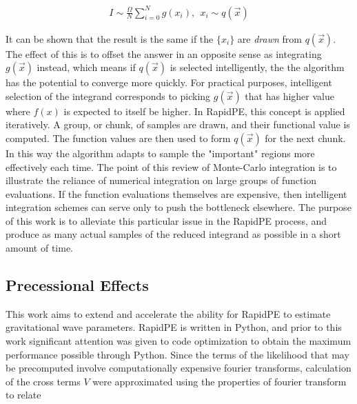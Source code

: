 \begin{align}
I \sim \frac{\Omega}{N}\sum_{i = 0}^N g(x_i), \ \ x_i \sim q(\vec{x})
\end{align}

It can be shown that the result is the same if the $\{x_i\}$ are \textit{drawn} from $q(\vec{x})$. The effect of this is to offset the answer in an opposite sense as integrating $g(\vec{x})$ instead, which means if $q(\vec{x})$ is selected intelligently, the the algorithm has the potential to converge more quickly. For practical purposes, intelligent selection of the integrand corresponds to picking $g(\vec{x})$ that has higher value where $f(x)$ is expected to itself be higher. 
In RapidPE, this concept is applied iteratively. A group, or chunk, of samples are drawn, and their functional value is computed. The function values are then used to form $q(\vec{x})$ for the next chunk. In this way the algorithm adapts to sample the "important" regions more effectively each time. 
The point of this review of Monte-Carlo integration is to illustrate the reliance of numerical integration on large groups of function evaluations. If the function evaluations themselves are expensive, then intelligent integration schemes can serve only to push the bottleneck elsewhere. The purpose of this work is to alleviate this particular issue in the RapidPE process, and produce as many actual samples of the reduced integrand as possible in a short amount of time.


\subsection{Precessional Effects}
This work aims to extend and accelerate the ability for RapidPE to estimate gravitational wave parameters. RapidPE is written in Python, and prior to this work significant attention was given to code optimization to obtain the maximum performance possible through Python. Since the terms of the likelihood that may be precomputed involve computationally expensive fourier transforms, calculation of the cross terms $V$ were approximated using the properties of fourier transform to relate 


